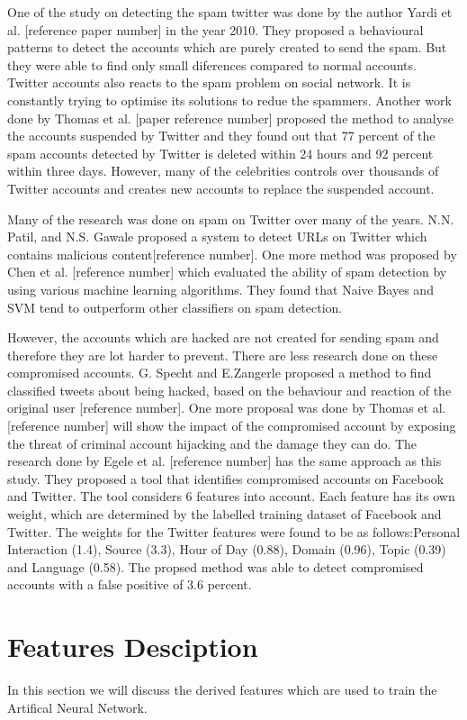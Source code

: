 \documentclass[conference]{IEEEtran}
\begin{document}
One of the study on detecting the spam twitter was done by the author Yardi et al. [reference paper number] in the year 2010. They proposed a behavioural patterns to detect the accounts which are purely created to send the spam. But they were able to find only small diferences compared to normal accounts. Twitter accounts also reacts to the spam problem on social network. It is constantly trying to optimise its solutions to redue the spammers. Another work done by Thomas et al. [paper reference number] proposed the method to analyse the accounts suspended by Twitter and they found out that 77 percent of the spam accounts detected by Twitter is deleted within 24 hours and 92 percent within three days. However, many of the celebrities controls over thousands of Twitter accounts and creates new accounts to replace the suspended account. 

Many of the research was done on spam on Twitter over many of the years. N.N. Patil, and N.S. Gawale proposed a system to detect URLs on Twitter which contains malicious content[reference number]. One more method was proposed by Chen et al. [reference number] which evaluated the ability of spam detection by using various machine learning algorithms. They found that Naive Bayes and SVM tend to outperform other classifiers on spam detection.

However, the accounts which are hacked are not created for sending spam and therefore they are lot harder to prevent. There are less research done on these compromised accounts. G. Specht and  E.Zangerle proposed a method to find classified tweets about being hacked,
based on the behaviour and reaction of the original user [reference number]. One more proposal was done by Thomas et al. [reference number] will show the impact of the compromised account by exposing the threat of criminal account hijacking and the damage they can do. The research done by Egele et al. [reference number]  has the same approach as this study. They proposed a tool that identifies compromised accounts on Facebook and Twitter. The tool considers 6 features into account. Each feature has its own weight, which are determined  by the labelled training dataset of Facebook and Twitter. The weights for the Twitter features were found to be as follows:Personal Interaction (1.4),  Source (3.3), Hour of Day (0.88), Domain (0.96), Topic (0.39) and  Language (0.58). The propsed method was able to detect compromised accounts with a false positive of 3.6 percent.

\section{Features Desciption}
In this section we will discuss the derived features which are used to train the Artifical Neural Network.
\end{document}
